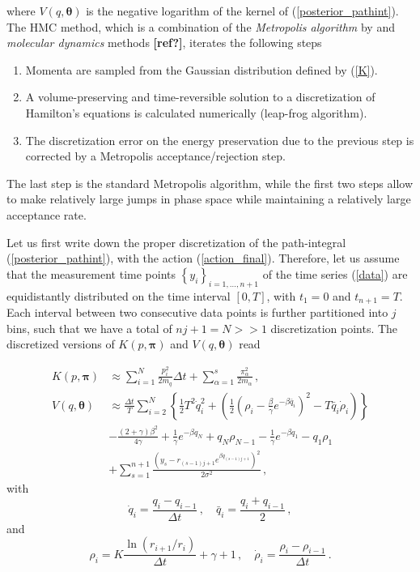 \documentclass[11pt, a4paper]{article}
\newcommand{\bt}{\pmb\theta}
\begin{document}
where $V( q,\bt)$ is the negative logarithm of the kernel of (\ref{posterior_pathint}).
The HMC method, which is a combination of the {\em Metropolis algorithm} by \cite{metropolis_1953_MRT2} and {\em molecular dynamics} methods \textbf{[ref?]}, iterates the following steps

\begin{enumerate}
  \item
  Momenta are sampled from the Gaussian distribution defined by (\ref{K}).
  \item
  A volume-preserving and time-reversible solution to a discretization of Hamilton's equations is calculated numerically (leap-frog algorithm).
  \item
  The discretization error on the energy preservation due to the previous step is corrected by a Metropolis acceptance/rejection step.
\end{enumerate}

The last step is the standard Metropolis algorithm, while the first two steps allow to make relatively large jumps in phase space while maintaining a relatively large acceptance rate.

Let us first write down the proper discretization of the path-integral (\ref{posterior_pathint}), with the action (\ref{action_final}).
Therefore, let us assume that the measurement time points $\left\{ y_i \right\}_{i=1,\dots, n+1}$ of the time series (\ref{data}) are equidistantly distributed on the time interval $[0,T]$, with $t_1=0$ and $t_{n+1}=T$.
Each interval between two consecutive data points is further partitioned into $j$ bins, such that we have a total of $nj+1=N>>1$ discretization points.
The discretized versions of $K( p,{\pmb\pi})$ and $V( q,\bt)$ read

\begin{align}
   K( p,{\pmb\pi})
   &\approx
   \sum_{i=1}^N
   \frac{ p_i^2}{2m_q}\Delta t
   +
   \sum_{\alpha=1}^s\frac{\pi_\alpha^2}{2m_\alpha}\,,\label{Kdisc}
   \\
   V(q,\bt)
   &\approx
   \frac{\Delta t}{T}
   \sum_{i=2}^{N}
   \left\{
    \frac{1}{2} T^2 \dot q_i^2
    +
   \left(
        \frac{1}{2}
        \left(
            \rho_i-\frac{\beta}{\gamma}e^{-\beta \bar q_i}
        \right)^2
        -
        T\bar q_i\dot\rho_i
    \right)
   \right\}
  \\
  &-
  \frac{(2+\gamma)\beta^2}{4\gamma}
  +
  \frac{1}{\gamma}
  e^{-\beta q_N}
  +
  q_N \rho_{N-1}
  -
  \frac{1}{\gamma}
  e^{-\beta q_1}
  -
  q_1 \rho_{1}
  \nonumber
  \\
  & +
  \sum_{s=1}^{n+1}
  \frac{(y_s-r_{(s-1)j+1} e^{\beta q_{(s-1)j+1}})^2}{2\sigma^2}
   \,,\label{Vdisc}
\end{align}
with
\begin{equation}
  \dot q_i = \frac{q_i-q_{i-1}}{\Delta t}\,,\quad
  \bar q_i = \frac{q_i+q_{i-1}}{2}\,,
\end{equation}
and
\begin{equation}\label{rhodisc}
\rho_i = K \frac{\ln(r_{i+1}/r_i)}{\Delta t}+\gamma+1\,,\quad
\dot\rho_i = \frac{\rho_i-\rho_{i-1}}{\Delta t}\,.
\end{equation}
\end{document}
